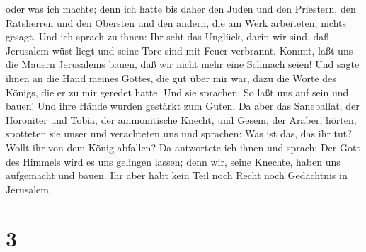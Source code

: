oder was ich machte; denn ich hatte bis daher den Juden und den
Priestern, den Ratsherren und den Obersten und den andern, die am Werk
arbeiteten, nichts gesagt.  Und ich sprach zu ihnen: Ihr
seht das Unglück, darin wir sind, daß Jerusalem wüst liegt und seine
Tore sind mit Feuer verbrannt. Kommt, laßt uns die Mauern Jerusalems
bauen, daß wir nicht mehr eine Schmach seien!  Und sagte
ihnen an die Hand meines Gottes, die gut über mir war, dazu die Worte
des Königs, die er zu mir geredet hatte. Und sie sprachen: So laßt uns
auf sein und bauen! Und ihre Hände wurden gestärkt zum Guten.
 Da aber das Saneballat, der Horoniter und Tobia, der
ammonitische Knecht, und Gesem, der Araber, hörten, spotteten sie unser
und verachteten uns und sprachen: Was ist das, das ihr tut? Wollt ihr
von dem König abfallen?  Da antwortete ich ihnen und
sprach: Der Gott des Himmels wird es uns gelingen lassen; denn wir,
seine Knechte, haben uns aufgemacht und bauen. Ihr aber habt kein Teil
noch Recht noch Gedächtnis in Jerusalem.

\hypertarget{section-2}{%
\section{3}\label{section-2}}

